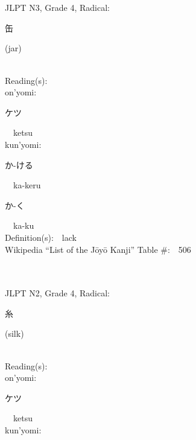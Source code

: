 \begin{multicols}{2}
\ \ \\
{\fontsize{34pt}{40pt}  }\ \ \\  %
{JLPT N3, Grade 4, Radical:\ \ {\begin{CJK}{UTF8}{min} 缶 \end{CJK}} (jar) } \\
Reading(s):\ \ \\
{\hspace*{1em}}on'yomi:\ \ \\
{\hspace*{2em}}{\begin{CJK}{UTF8}{min} ケツ \end{CJK}}\ \ ketsu\ \ \\
{\hspace*{1em}}kun'yomi:\ \ \\
{\hspace*{2em}}{\begin{CJK}{UTF8}{min} か-ける \end{CJK}}\ \ ka-keru\ \ \\
{\hspace*{2em}}{\begin{CJK}{UTF8}{min} か-く \end{CJK}}\ \ ka-ku\ \ \\
Definition(s):\ \ lack \\
Wikipedia ``List of the J\=oy\=o Kanji'' Table \#:\ \ 506 \\
\ \ \\
{\fontsize{34pt}{40pt}  }\ \ \\  %
{JLPT N2, Grade 4, Radical:\ \ {\begin{CJK}{UTF8}{min} 糸 \end{CJK}} (silk) } \\
Reading(s):\ \ \\
{\hspace*{1em}}on'yomi:\ \ \\
{\hspace*{2em}}{\begin{CJK}{UTF8}{min} ケツ \end{CJK}}\ \ ketsu\ \ \\
{\hspace*{1em}}kun'yomi:\ \ \\

\end{multicols}
